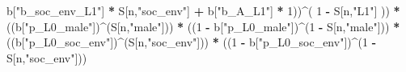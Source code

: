 \documentclass[
]{book}
\newenvironment{Shaded}{\begin{snugshade}}{\end{snugshade}}
\newcommand{\DecValTok}[1]{\textcolor[rgb]{0.00,0.00,0.81}{#1}}
\newcommand{\NormalTok}[1]{#1}
\newcommand{\SpecialCharTok}[1]{\textcolor[rgb]{0.81,0.36,0.00}{\textbf{#1}}}
\newcommand{\StringTok}[1]{\textcolor[rgb]{0.31,0.60,0.02}{#1}}
\begin{document}
\begin{Shaded}
\begin{Highlighting}[]
\NormalTok{                 b[}\StringTok{"b\_soc\_env\_L1"}\NormalTok{] }\SpecialCharTok{*}\NormalTok{ S[n,}\StringTok{"soc\_env"}\NormalTok{] }\SpecialCharTok{+}
\NormalTok{                 b[}\StringTok{"b\_A\_L1"}\NormalTok{] }\SpecialCharTok{*} \DecValTok{1}\NormalTok{))}\SpecialCharTok{\^{}}\NormalTok{( }\DecValTok{1} \SpecialCharTok{{-}}\NormalTok{ S[n,}\StringTok{"L1"}\NormalTok{] )) }\SpecialCharTok{*}
\NormalTok{      ((b[}\StringTok{"p\_L0\_male"}\NormalTok{])}\SpecialCharTok{\^{}}\NormalTok{(S[n,}\StringTok{"male"}\NormalTok{])) }\SpecialCharTok{*} 
\NormalTok{      ((}\DecValTok{1} \SpecialCharTok{{-}}\NormalTok{ b[}\StringTok{"p\_L0\_male"}\NormalTok{])}\SpecialCharTok{\^{}}\NormalTok{(}\DecValTok{1} \SpecialCharTok{{-}}\NormalTok{ S[n,}\StringTok{"male"}\NormalTok{])) }\SpecialCharTok{*} 
\NormalTok{      ((b[}\StringTok{"p\_L0\_soc\_env"}\NormalTok{])}\SpecialCharTok{\^{}}\NormalTok{(S[n,}\StringTok{"soc\_env"}\NormalTok{])) }\SpecialCharTok{*}
\NormalTok{      ((}\DecValTok{1} \SpecialCharTok{{-}}\NormalTok{ b[}\StringTok{"p\_L0\_soc\_env"}\NormalTok{])}\SpecialCharTok{\^{}}\NormalTok{(}\DecValTok{1} \SpecialCharTok{{-}}\NormalTok{ S[n,}\StringTok{"soc\_env"}\NormalTok{])) }
    

\end{Highlighting}
\end{Shaded}
\end{document}
